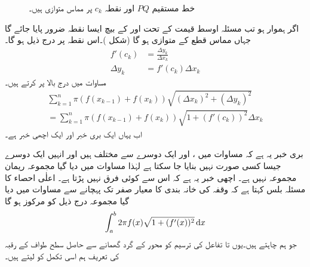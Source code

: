 \begin{figure}
\begin{minipage}{0.45\textwidth}
\caption{خط مستقیم $PQ$ اور نقطہ $c_k$ پر مماس متوازی ہیں۔}
\label{شکل_تکمل_استعمال_مماس_متوازی_لکیر}
\end{minipage}\hfill
\end{figure}


اگر  ہموار ہو تب مسئلہ اوسط قیمت کے تحت  اور  کے بیچ ایسا نقطہ  ضرور پایا جائے گا جہاں مماس قطع  کے متوازی ہو گا (شکل )۔اس نقطہ پر درج ذیل ہو گا۔
\begin{align*}
f'(c_k)&=\frac{\Delta y_k}{\Delta x_k}\\
\Delta y_k&=f'(c_k)\Delta x_k
\end{align*} 
مساوات  میں درج بالا  پر کرتے ہیں۔
\begin{multline}\label{مساوات_تکمل_استعمال_سطحی_رقبہ_ب}
\sum_{k=1}^n \pi(f(x_{k-1})+f(x_k))\sqrt{(\Delta x_k)^2+(\Delta y_k)^2}\\
=\sum_{k=1}^n\pi(f(x_{k-1})+f(x_k))\sqrt{1+(f'(c_k))^2}\Delta x_k
\end{multline}
اب یہاں ایک بری خبر اور ایک اچھی خبر ہے۔

بری خبر یہ ہے کہ مساوات  میں  ،  اور  ایک دوسرے سے مختلف ہیں اور انہیں ایک دوسرے جیسا کسی صورت نہیں بنایا جا سکتا ہے لہٰذا مساوات  میں دیا گیا مجموعہ  ریمان مجموعہ نہیں ہے۔ اچھی خبر یہ ہے کہ اس سے کوئی فرق نہیں پڑتا ہے۔ اعلٰی احصاء کا مسئلہ بلس کہتا ہے کہ وقفہ  کی خانہ بندی کا معیار صفر تک پہچانے سے مساوات  میں دیا گیا مجموعہ درج ذیل کو مرکوز ہو گا
\begin{align*}
\int_a^b2\pi f(x)\sqrt{1+(f'(x))^2}\dif x
\end{align*} 
جو ہم چاہتے ہیں۔یوں   تا  تفاعل  کی ترسیم کو  محور کے گرد گھمانے سے حاصل سطح طواف کے رقبہ کی تعریف ہم اسی تکمل کو لیتے ہیں۔

